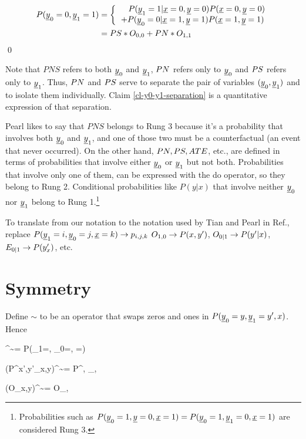 \begin{align}
P({\underline{y}}_0=0, {\underline{y}}_1=1)
&=
\left\{
\begin{array}{c}
\quad P({\underline{y}}_1=1|{\underline{x}}=0, {\underline{y}}=0)P({\underline{x}}=0, {\underline{y}}=0)
\\
+ P({\underline{y}}_0=0|{\underline{x}}=1, {\underline{y}}=1)P({\underline{x}}=1, {\underline{y}}=1)
\end{array}
\right.
\\
&=
PS *O_{0,0}
+
PN *O_{1,1}
\end{align}
\qed

Note that $PNS$ refers to 
both ${\underline{y}}_0$ and ${\underline{y}}_1$,
$PN$ refers only to
${\underline{y}}_0$ and $PS$ refers only to
${\underline{y}}_1$. Thus, $PN$ and $PS$
serve to separate the pair
of variables
$({\underline{y}}_0, {\underline{y}}_1)$
and to isolate them individually.
Claim \ref{cl-y0-y1-separation}
is a quantitative expression of that 
separation. 

Pearl likes to say that 
$PNS$ belongs to Rung 3 because it's a 
probability that involves both 
${\underline{y}}_0$ and ${\underline{y}}_1$, and
one of those two must be a counterfactual 
(an event that never occurred). On the 
other hand, $PN, PS, ATE$, etc., 
are defined in terms of probabilities
that involve either ${\underline{y}}_0$
or ${\underline{y}}_1$ but not both. 
Probabilities that
involve only one of them,  
 can be
expressed with the do operator,
so they belong to Rung 2.
Conditional probabilities
like $P(y|x)$ that
involve neither ${\underline{y}}_0$
nor ${\underline{y}}_1$  belong to Rung 1.\footnote{
Probabilities
such as $P({\underline{y}}_0=1,{\underline{y}}=0,{\underline{x}}=1)=
P({\underline{y}}_0=1, {\underline{y}}_1=0, {\underline{x}}=1)$
are considered Rung 3.}



To 
translate
from 
our notation 
to the notation
used by Tian and Pearl in
Ref.\cite{pearl-tian-2000},
 replace $P({\underline{y}}_1=i,
 {\underline{y}}_0=j, {\underline{x}}=k)\rightarrow p_{i,j,k}$
$O_{1,0}\rightarrow P(x,y') $,
$O_{0|1}\rightarrow P(y'|x)$, 
$ E_{0|1}\rightarrow P(y'_x)$, etc.


\section{Symmetry}


Define $\sim$ to 
be an operator that swaps zeros and ones 
in $P({\underline{y}}_0=y, {\underline{y}}_1=y', x)$.
Hence

\beq
[P(\rvy_0=y, \rvy_1=y', \rvx=x)]^\sim=
P(\rvy_1=, \rvy_0=, \rvx=)
\eeq

\beq 
(P^{x',y'}_{x,y})^\sim= P^{, }_{, }
\eeq

\beq
(O_{x,y})^\sim = O_{,}
\eeq

